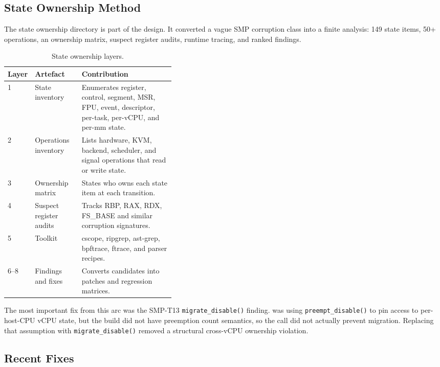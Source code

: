 \subsection{State Ownership Method}

The state ownership directory is part of the design. It converted a
vague SMP corruption class into a finite analysis:
149 state items, 50+ operations, an ownership matrix, suspect
register audits, runtime tracing, and ranked findings.

\begin{table}[h]
\centering
\caption{State ownership layers.}
\begin{tabularx}{\linewidth}{@{}p{0.09\linewidth}p{0.29\linewidth}X@{}}
\toprule
Layer & Artefact & Contribution \\
\midrule
1 & State inventory & Enumerates register, control, segment, MSR, FPU, event, descriptor, per-task, per-vCPU, and per-mm state. \\
2 & Operations inventory & Lists hardware, KVM, backend, scheduler, and signal operations that read or write state. \\
3 & Ownership matrix & States who owns each state item at each transition. \\
4 & Suspect register audits & Tracks RBP, RAX, RDX, FS\_BASE and similar corruption signatures. \\
5 & Toolkit & cscope, ripgrep, ast-grep, bpftrace, ftrace, and parser recipes. \\
6--8 & Findings and fixes & Converts candidates into patches and regression matrices. \\
\bottomrule
\end{tabularx}
\end{table}

The most important fix from this arc was the SMP-T13
\texttt{migrate\_disable()} finding. \UML{} was using
\texttt{preempt\_disable()} to pin access to per-host-CPU vCPU state,
but the build did not have preemption count semantics, so the call did
not actually prevent migration. Replacing that assumption with
\texttt{migrate\_disable()} removed a structural cross-vCPU ownership
violation.

\subsection{Recent Fixes}

